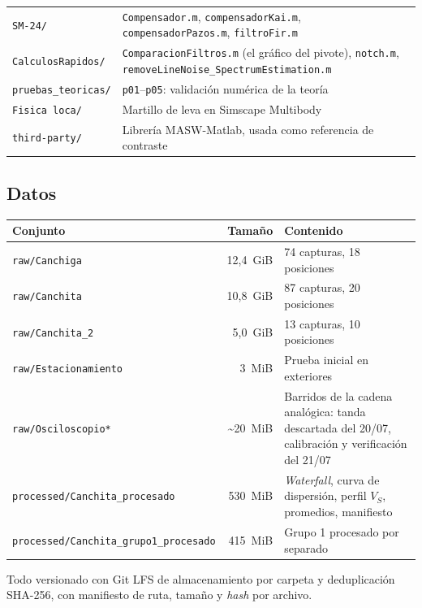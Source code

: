 \begin{center}
\begin{tabularx}{\textwidth}{@{}l X@{}}
\texttt{SM-24/} & \texttt{Compensador.m}, \texttt{compensadorKai.m}, \texttt{compensadorPazos.m}, \texttt{filtroFir.m} \\
\texttt{CalculosRapidos/} & \texttt{ComparacionFiltros.m} (el gr\'afico del pivote), \texttt{notch.m}, \texttt{removeLineNoise\_SpectrumEstimation.m} \\
\texttt{pruebas\_teoricas/} & \texttt{p01}--\texttt{p05}: validaci\'on num\'erica de la teor\'ia \\
\texttt{Fisica loca/} & Martillo de leva en Simscape Multibody \\
\texttt{third-party/} & Librer\'ia MASW-Matlab, usada como referencia de contraste \\
\bottomrule
\end{tabularx}
\end{center}

\subsection{Datos}

\begin{center}\small
\begin{tabularx}{\textwidth}{@{}l r X@{}}
\toprule
\textbf{Conjunto} & \textbf{Tama\~no} & \textbf{Contenido} \\
\midrule
\texttt{raw/Canchiga} & 12{,}4~GiB & 74 capturas, 18 posiciones \\
\texttt{raw/Canchita} & 10{,}8~GiB & 87 capturas, 20 posiciones \\
\texttt{raw/Canchita\_2} & 5{,}0~GiB & 13 capturas, 10 posiciones \\
\texttt{raw/Estacionamiento} & 3~MiB & Prueba inicial en exteriores \\
\texttt{raw/Osciloscopio*} & \textasciitilde{}20~MiB & Barridos de la cadena anal\'ogica: tanda descartada del 20/07, calibraci\'on y verificaci\'on del 21/07 \\
\texttt{processed/Canchita\_procesado} & 530~MiB & \emph{Waterfall}, curva de dispersi\'on, perfil $V_S$, promedios, manifiesto \\
\texttt{processed/Canchita\_grupo1\_procesado} & 415~MiB & Grupo 1 procesado por separado \\
\bottomrule
\end{tabularx}
\end{center}

Todo versionado con Git LFS de almacenamiento por carpeta y deduplicaci\'on
SHA-256, con manifiesto de ruta, tama\~no y \emph{hash} por archivo.

